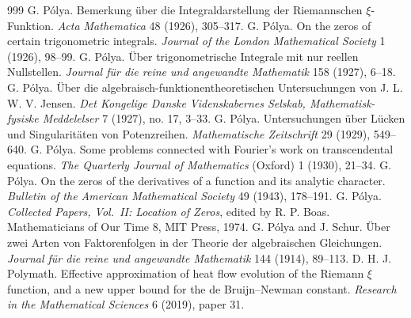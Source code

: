 \begin{thebibliography}{999}
 G. P\'olya. Bemerkung \"uber die Integraldarstellung der Riemannschen $\xi$-Funktion. \emph{Acta Mathematica} 48 (1926), 305--317.
 G. P\'olya. On the zeros of certain trigonometric integrals. \emph{Journal of the London Mathematical Society} 1 (1926), 98--99.
 G. P\'olya. \"Uber trigonometrische Integrale mit nur reellen Nullstellen. \emph{Journal f\"ur die reine und angewandte Mathematik} 158 (1927), 6--18.
 G. P\'olya. \"Uber die algebraisch-funktionentheoretischen Untersuchungen von J. L. W. V. Jensen. \emph{Det Kongelige Danske Videnskabernes Selskab, Mathematisk-fysiske Meddelelser} 7 (1927), no. 17, 3--33.
 G. P\'olya. Untersuchungen \"uber L\"ucken und Singularit\"aten von Potenzreihen. \emph{Mathematische Zeitschrift} 29 (1929), 549--640.
 G. P\'olya. Some problems connected with Fourier's work on transcendental equations. \emph{The Quarterly Journal of Mathematics} (Oxford) 1 (1930), 21--34.
 G. P\'olya. On the zeros of the derivatives of a function and its analytic character. \emph{Bulletin of the American Mathematical Society} 49 (1943), 178--191.
 G. P\'olya. \emph{Collected Papers, Vol.~II: Location of Zeros}, edited by R. P. Boas. Mathematicians of Our Time 8, MIT Press, 1974.
 G. P\'olya and J. Schur. \"Uber zwei Arten von Faktorenfolgen in der Theorie der algebraischen Gleichungen. \emph{Journal f\"ur die reine und angewandte Mathematik} 144 (1914), 89--113.
 D. H. J. Polymath. Effective approximation of heat flow evolution of the Riemann $\xi$ function, and a new upper bound for the de Bruijn--Newman constant. \emph{Research in the Mathematical Sciences} 6 (2019), paper 31.

\end{thebibliography}

